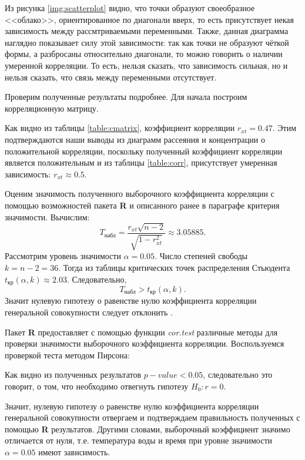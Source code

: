 Из рисунка \ref{img:scatterplot} видно, что точки образуют своеобразное <<облако>>, ориентированное по диагонали вверх, то есть присутствует некая зависимость между рассмтриваемыми переменными. Также, данная диаграмма наглядно показывает силу этой зависимости: так как точки не образуют чёткой формы, а разбросаны относительно диагонали, то можно говорить о наличии умеренной корреляции. То есть, нельзя сказать, что зависимость сильная, но и нельзя сказать, что связь между переменными отсутствует.

Проверим полученные результаты подробнее. Для начала построим корреляционную матрицу.

Как видно из таблицы \ref{table:cmatrix}, коэффициент корреляции $r_{xt} = 0.47$. Этим подтверждаются наши выводы из диаграмм рассеяния и концентрации о положительной корреляции, поскольку полученный коэффициент корреляции является положительным и из таблицы \ref{table:corr}, присутствует умеренная зависимость: $r_{xt} \approx 0.5$.

Оценим значимость полученного выборочного коэффициента корреляции с помощью возможностей пакета \textbf{R} и описанного ранее в параграфе критерия значимости. Вычислим:
\begin{equation*}
	T_{\textrm{набл}} = \frac{r_{xt} \sqrt{n - 2}}{\sqrt{1 - r_{xt}^2}} \approx 3.05885.
\end{equation*}
Рассмотрим уровень значимости $\alpha = 0.05$. Число степеней свободы $k = n - 2 = 36$. Тогда из таблицы критических точек распределения Стьюдента $t_\textrm{кр}(\alpha, k) \approx 2.03$. Следовательно,
\begin{equation*}
	T_{\textrm{набл}} > t_\textrm{кр}(\alpha, k).
\end{equation*}
Значит нулевую гипотезу о равенстве нулю коэффициента корреляции генеральной совокупности следует отклонить \cite{Eliseeva1995}.

Пакет \textbf{R} предоставляет с помощью функции \textit{cor.test} различные методы для проверки значимости выборочного коэффициента корреляции. Воспользуемся проверкой теста методом Пирсона:

Как видно из полученных результатов $p-value < 0.05$, следовательно это говорит, о том, что необходимо отвегнуть гипотезу $H_0: r = 0$.

Значит, нулевую гипотезу о равенстве нулю коэффициента корреляции генеральной совокупности отвергаем и подтверждаем правильность полученных с помощью \textbf{R} результатов. Другими словами, выборочный коэффициент значимо отличается от нуля, т.е. температура воды и время при уровне значимости $\alpha = 0.05$ имеют зависимость.

